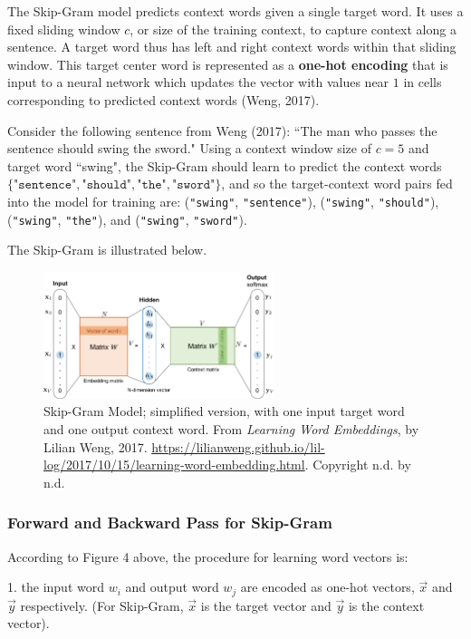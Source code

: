The Skip-Gram model predicts context words given a single target word. It uses a fixed sliding window $c$, or size of the training context, to capture context along a sentence. A target word thus has left and right context words within that sliding window. This target center word is represented as a \textbf{one-hot encoding} that is input to a neural network which updates the vector with values near $1$ in cells corresponding to predicted context words (Weng, 2017).

Consider the following sentence from Weng (2017): ``The man who passes the sentence should swing the sword." Using a context window size of $c = 5$ and target word ``swing", the Skip-Gram should learn to predict the context words $\{\texttt{"sentence"}, \texttt{"should"}, \texttt{"the"}, \texttt{"sword"} \}$, and so the target-context word pairs fed into the model for training are: (\texttt{"swing"}, \texttt{"sentence"}), (\texttt{"swing"}, \texttt{"should"}), (\texttt{"swing"}, \texttt{"the"}), and (\texttt{"swing"}, \texttt{"sword"}). 

The Skip-Gram is illustrated below. 

\begin{figure}[h]
\centering
\includegraphics[width=0.6\textwidth]{imgs/skipgram_image.png}
\caption{Skip-Gram Model; simplified version, with one input target word and one output context word. From \emph{Learning Word Embeddings}, by Lilian Weng, 2017. \url{https://lilianweng.github.io/lil-log/2017/10/15/learning-word-embedding.html}. Copyright n.d. by n.d.}
\end{figure}

\subsubsection{Forward and Backward Pass for Skip-Gram}

According to Figure 4 above, the procedure for learning word vectors is: 

1. the input word $w_i$ and output word $w_j$ are encoded as one-hot vectors, $\overrightarrow{x}$ and $\overrightarrow{y}$ respectively. (For Skip-Gram, $\overrightarrow{x}$ is the target vector and $\overrightarrow{y}$ is the context vector). 

